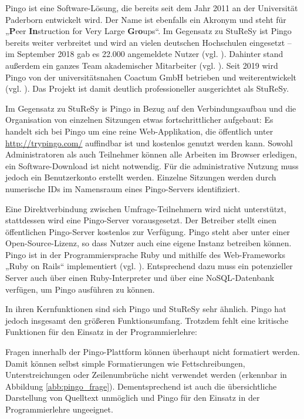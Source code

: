 Pingo ist eine Software-Lösung, die bereits seit dem Jahr 2011 an der Universität Paderborn entwickelt wird. Der Name ist ebenfalls ein Akronym und steht für „\textbf{P}eer \textbf{In}struction for Very Large \textbf{G}r\textbf{o}ups“. Im Gegensatz zu StuReSy ist Pingo bereits weiter verbreitet und wird an vielen deutschen Hochschulen eingesetzt – im September 2018 gab es 22.000 angemeldete Nutzer (vgl. \cite{web:pingo_zukunft}). Dahinter stand außerdem ein ganzes Team akademischer Mitarbeiter (vgl. \cite{web:pingo_team}). Seit 2019 wird Pingo von der universitätsnahen Coactum GmbH betrieben und weiterentwickelt (vgl. \cite{web:pingo_coactum}). Das Projekt ist damit deutlich professioneller ausgerichtet als StuReSy.

Im Gegensatz zu StuReSy is Pingo in Bezug auf den Verbindungsaufbau und die Organisation von einzelnen Sitzungen etwas fortschrittlicher aufgebaut: Es handelt sich bei Pingo um eine reine Web-Applikation, die öffentlich unter \url{http://trypingo.com/} auffindbar ist und kostenlos genutzt werden kann. Sowohl Administratoren als auch Teilnehmer können alle Arbeiten im Browser erledigen, ein Software-Download ist nicht notwendig. Für die administrative Nutzung muss jedoch ein Benutzerkonto erstellt werden. Einzelne Sitzungen werden durch numerische IDs im Namensraum eines Pingo-Servers identifiziert.


Eine Direktverbindung zwischen Umfrage-Teilnehmern wird nicht unterstützt, stattdessen wird eine Pingo-Server vorausgesetzt. Der Betreiber stellt einen öffentlichen Pingo-Server kostenlos zur Verfügung. Pingo steht aber unter einer Open-Source-Lizenz, so dass Nutzer auch eine eigene Instanz betreiben können. Pingo ist in der Programmiersprache Ruby und mithilfe des Web-Frameworks „Ruby on Rails“ implementiert (vgl. \cite{web:pingo_github}). Entsprechend dazu muss ein potenzieller Server auch über einen Ruby-Interpreter und über eine NoSQL-Datenbank verfügen, um Pingo ausführen zu können.

In ihren Kernfunktionen sind sich Pingo und StuReSy sehr ähnlich. Pingo hat jedoch insgesamt den größeren Funktionsumfang. Trotzdem fehlt eine kritische Funktionen für den Einsatz in der Programmierlehre:

Fragen innerhalb der Pingo-Plattform können überhaupt nicht formatiert werden. Damit können selbst simple Formatierungen wie Fettschreibungen, Unterstreichungen oder Zeilenumbrüche nicht verwendet werden (erkennbar in Abbildung \ref{abb:pingo_frage}). Dementsprechend ist auch die übersichtliche Darstellung von Quelltext unmöglich und Pingo für den Einsatz in der Programmierlehre ungeeignet.


